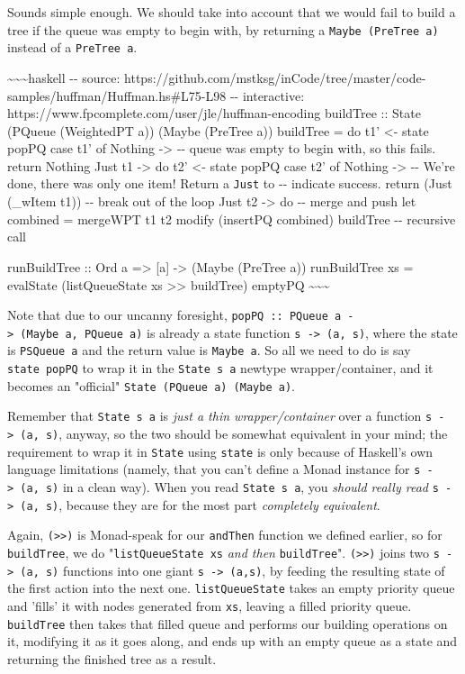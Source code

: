 \documentclass[]{article}
\begin{document}
Sounds simple enough. We should take into account that we would fail to build a
tree if the queue was empty to begin with, by returning a
\texttt{Maybe\ (PreTree\ a)} instead of a \texttt{PreTree\ a}.

\textasciitilde{}\textasciitilde{}\textasciitilde{}haskell -\/- source:
https://github.com/mstksg/inCode/tree/master/code-samples/huffman/Huffman.hs\#L75-L98
-\/- interactive: https://www.fpcomplete.com/user/jle/huffman-encoding buildTree
:: State (PQueue (WeightedPT a)) (Maybe (PreTree a)) buildTree = do t1'
\textless{}- state popPQ case t1' of Nothing -\textgreater{} -\/- queue was
empty to begin with, so this fails. return Nothing Just t1 -\textgreater{} do
t2' \textless{}- state popPQ case t2' of Nothing -\textgreater{} -\/- We're
done, there was only one item! Return a \texttt{Just} to -\/- indicate success.
return (Just (\_wItem t1)) -\/- break out of the loop Just t2 -\textgreater{} do
-\/- merge and push let combined = mergeWPT t1 t2 modify (insertPQ combined)
buildTree -\/- recursive call

runBuildTree :: Ord a =\textgreater{} {[}a{]} -\textgreater{} (Maybe (PreTree
a)) runBuildTree xs = evalState (listQueueState xs \textgreater{}\textgreater{}
buildTree) emptyPQ \textasciitilde{}\textasciitilde{}\textasciitilde{}

Note that due to our uncanny foresight,
\texttt{popPQ\ ::\ PQueue\ a\ -\textgreater{}\ (Maybe\ a,\ PQueue\ a)} is
already a state function \texttt{s\ -\textgreater{}\ (a,\ s)}, where the state
is \texttt{PSQueue\ a} and the return value is \texttt{Maybe\ a}. So all we need
to do is say \texttt{state\ popPQ} to wrap it in the \texttt{State\ s\ a}
newtype wrapper/container, and it becomes an "official"
\texttt{State\ (PQueue\ a)\ (Maybe\ a)}.

Remember that \texttt{State\ s\ a} is \emph{just a thin wrapper/container} over
a function \texttt{s\ -\textgreater{}\ (a,\ s)}, anyway, so the two should be
somewhat equivalent in your mind; the requirement to wrap it in \texttt{State}
using \texttt{state} is only because of Haskell's own language limitations
(namely, that you can't define a Monad instance for
\texttt{s\ -\textgreater{}\ (a,\ s)} in a clean way). When you read
\texttt{State\ s\ a}, you \emph{should really read}
\texttt{s\ -\textgreater{}\ (a,\ s)}, because they are for the most part
\emph{completely equivalent}.

Again, \texttt{(\textgreater{}\textgreater{})} is Monad-speak for our
\texttt{andThen} function we defined earlier, so for \texttt{buildTree}, we do
"\texttt{listQueueState\ xs} \emph{and then} \texttt{buildTree}".
\texttt{(\textgreater{}\textgreater{})} joins two
\texttt{s\ -\textgreater{}\ (a,\ s)} functions into one giant
\texttt{s\ -\textgreater{}\ (a,s)}, by feeding the resulting state of the first
action into the next one. \texttt{listQueueState} takes an empty priority queue
and 'fills' it with nodes generated from \texttt{xs}, leaving a filled priority
queue. \texttt{buildTree} then takes that filled queue and performs our building
operations on it, modifying it as it goes along, and ends up with an empty queue
as a state and returning the finished tree as a result.
\end{document}
